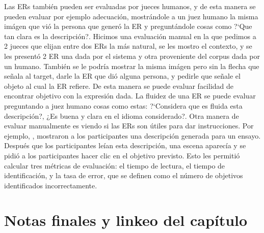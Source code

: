 Las ERs tambi\'en pueden ser evaluadas por jueces humanos, y de esta manera se pueden evaluar por ejemplo adecuaci\'on, mostr\'andole a un juez humano la misma im\'agen que vi\'o la persona que gener\'o la ER y pregunt\'andole cosas como ?`Que tan clara es la descripci\'on?.
Hicimos una evaluaci\'on manual en la que pedimos a 2 jueces que elijan entre dos ERs la m\'as natural, se les mostro el contexto, y se les present\'o 2 ER una dada por el sistema y otra proveniente del corpus dada por un humano. Tambi\'en se le podr\'ia mostrar la misma im\'agen pero sin la flecha que se\~nala al target, darle la ER que di\'o alguna persona, y pedirle que se\~nale el objeto al cual la ER refiere. De esta manera se puede evaluar facilidad de encontrar objetivo con la expresi\'on dada.
La fluidez de una ER se puede evaluar preguntando a juez humano cosas como estas: 
?`Considera que es fluida esta descripci\'on?, ¿Es buena y clara en el idioma considerado?. 
Otra manera de evaluar manualmente es viendo si las ERs son \'utiles para dar instrucciones. Por ejemplo, \cite{BelzGattEvaluation}, mostraron a los participantes una descripci\'on generada para un ensayo. Despu\'es que los participantes le\'ian esta descripci\'on, una escena aparec\'ia y se pidi\'o a los participantes
hacer clic en el objetivo previsto. Esto les permiti\'o calcular tres m\'etricas de evaluaci\'on: %
el tiempo de lectura, el tiempo de identificaci\'on, y la tasa de error, que se definen como el n\'umero de objetivos identificados incorrectamente.


\section{Notas finales y linkeo del cap\'itulo}
\label{sec:linkeo2}

